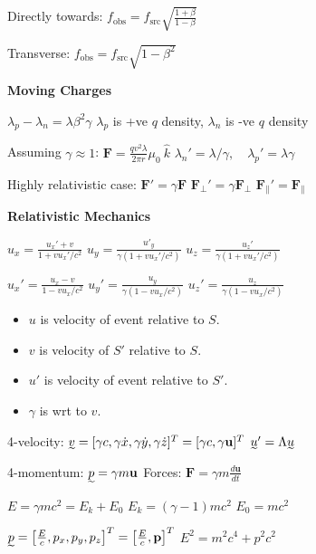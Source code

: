 \documentclass[twocolumn]{article}
\begin{document}
Directly towards: $f_{\text{obs}} = f_{\text{src}} \sqrt{\frac{1+\beta}{1-\beta}}$

Transverse: $f_{\text{obs}} = f_{\text{src}} \sqrt{1 - \beta^2}$

\dotfill

\textbf{Moving Charges}

$\lambda_p - \lambda_n = \lambda \beta^2 \gamma$ \hfill $\lambda_p$ is +ve $q$ density, $\lambda_n$ is -ve $q$ density

Assuming $\gamma \approx 1$: $\mathbf{F} = \frac{qv^2 \lambda}{2 \pi r} \mu_0\ \hat{k}$ \hfill $\lambda_n' = \lambda / \gamma, \quad \lambda_p' = \lambda \gamma$

Highly relativistic case: $\mathbf{F}' = \gamma \mathbf{F}$ \hfill $\mathbf{F}_\perp' = \gamma \mathbf{F}_\perp$ \hfill $\mathbf{F}_\parallel' = \mathbf{F}_\parallel$

\vspace{-.5em}
\dotfill

\textbf{Relativistic Mechanics}

$u_x = \frac{u_x' + v}{1 + vu_x' / c^2}$ \hfill $u_y = \frac{u'_y}{\gamma(1 + vu_x' / c^2)}$ \hfill $u_z = \frac{u_z'}{\gamma ( 1 + vu_x' / c^2)}$

$u_x' = \frac{u_x - v}{1 - vu_x/c^2}$ \hfill $u_y' = \frac{u_y}{\gamma (1-vu_x/c^2)}$ \hfill $u_z' = \frac{u_z}{\gamma (1-vu_x/c^2)}$
\begin{itemize}
    \item $u$ is velocity of event relative to $S$.
    \item $v$ is velocity of $S'$ relative to $S$.
    \item $u'$ is velocity of event relative to $S'$.
    \item $\gamma$ is wrt to $v$.
\end{itemize} \vspace{-.5em}

4-velocity: $\undertilde{v} = [\gamma c, \gamma \dot{x}, \gamma \dot{y}, \gamma \dot{z}]^T = [\gamma c, \gamma \mathbf{u}]^T$ \hfill $\undertilde{u}' = \Lambda \undertilde{u}$

4-momentum: $\undertilde{p} = \gamma m \mathbf{u}$ \hfill Forces: $\mathbf{F} = \gamma m \frac{d \mathbf u}{dt}$

$E = \gamma mc^2 = E_k + E_0$ \hfill $E_k = (\gamma - 1)mc^2$ \hfill $E_0 = mc^2$

$\undertilde{p} = \left[ \frac{E}{c}, p_x, p_y, p_z \right]^T = \left[ \frac{E}{c}, \mathbf{p} \right]^T$ \hfill $E^2 = m^2 c^4 + p^2 c^2$
\end{document}
